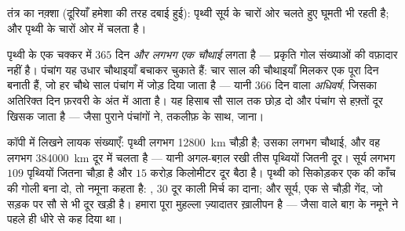 \begin{omfigure}

{\small तंत्र का नक़्शा (दूरियाँ हमेशा की तरह दबाई हुई): पृथ्वी सूर्य
के चारों ओर चलते हुए घूमती भी रहती है; और  पृथ्वी के चारों ओर
 में चलता है।}
\end{omfigure}

\begin{example}[चौथाई दिन और अधिवर्ष]\label{ex:g6:sun-earth-moon:leap}
पृथ्वी के एक चक्कर में $365$ दिन \emph{और लगभग एक चौथाई} लगता है ---
प्रकृति गोल संख्याओं की वफ़ादार नहीं है। पंचांग यह उधार चौथाइयाँ बचाकर
चुकाते हैं: चार साल की चौथाइयाँ मिलकर एक पूरा दिन बनाती हैं, जो हर
चौथे साल पंचांग में जोड़ दिया जाता है --- यानी $366$ दिन वाला
\emph{अधिवर्ष}, जिसका अतिरिक्त दिन फ़रवरी के अंत में आता है। यह
हिसाब सौ साल तक छोड़ दो और पंचांग  से हफ़्तों दूर खिसक जाता है ---
जैसा पुराने पंचांगों ने, तकलीफ़ के साथ, जाना।
\end{example}

\begin{example}[तंत्र, मापनी के साथ]\label{ex:g6:sun-earth-moon:scale}
कॉपी में लिखने लायक संख्याएँ: पृथ्वी लगभग \qty{12800}{km} चौड़ी है;
 उसका लगभग चौथाई, और वह लगभग \qty{384000}{km} दूर  में
चलता है --- यानी अगल-बग़ल रखी तीस पृथ्वियों जितनी दूर। सूर्य लगभग
$109$ पृथ्वियों जितना चौड़ा है और $15$ करोड़ किलोमीटर दूर बैठा है। पृथ्वी को सिकोड़कर एक  की काँच की
गोली बना दो, तो नमूना कहता है: , $30$  दूर काली मिर्च
का दाना; और सूर्य, एक  से चौड़ी गेंद, जो सड़क पर सौ  से भी
दूर खड़ी है। हमारा पूरा मुहल्ला ज़्यादातर ख़ालीपन है --- जैसा 
वाले बाग़ के नमूने ने पहले ही धीरे से कह दिया था।
\end{example}

